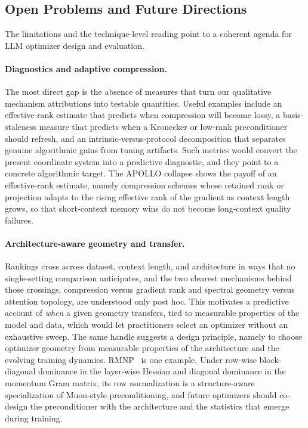 \subsection{Open Problems and Future Directions}
\label{sec:discussion-open-problems}

The limitations and the technique-level reading point to a coherent agenda for
LLM optimizer design and evaluation.

\paragraph{Diagnostics and adaptive compression.}
The most direct gap is the absence of measures that turn our qualitative
mechanism attributions into testable quantities. Useful examples include an
effective-rank estimate that predicts when compression will become lossy, a
basis-staleness measure that predicts when a Kronecker or low-rank preconditioner
should refresh, and an intrinsic-versus-protocol decomposition that separates
genuine algorithmic gains from tuning artifacts. Such metrics would convert the
present coordinate system into a predictive diagnostic, and they point to a
concrete algorithmic target. The APOLLO collapse shows the payoff of an
effective-rank estimate, namely compression schemes whose retained rank or projection
adapts to the rising effective rank of the gradient as context length grows, so
that short-context memory wins do not become long-context quality failures.

\paragraph{Architecture-aware geometry and transfer.}
Rankings cross across dataset, context length, and architecture in ways that no
single-setting comparison anticipates, and the two clearest mechanisms behind
those crossings, compression versus gradient rank and spectral geometry versus
attention topology, are understood only post hoc. This motivates a predictive
account of \emph{when} a given geometry transfers, tied to measurable properties
of the model and data, which would let practitioners select an optimizer without
an exhaustive sweep. The same handle suggests a design principle, namely to choose
optimizer geometry from measurable properties of the architecture and the
evolving training dynamics. RMNP~\citep{deng2026rmnp} is one example. Under row-wise
block-diagonal dominance in the layer-wise Hessian and diagonal dominance in the
momentum Gram matrix, its row normalization is a structure-aware specialization
of Muon-style preconditioning,
and future optimizers should co-design the preconditioner with the architecture
and the statistics that emerge during training.

